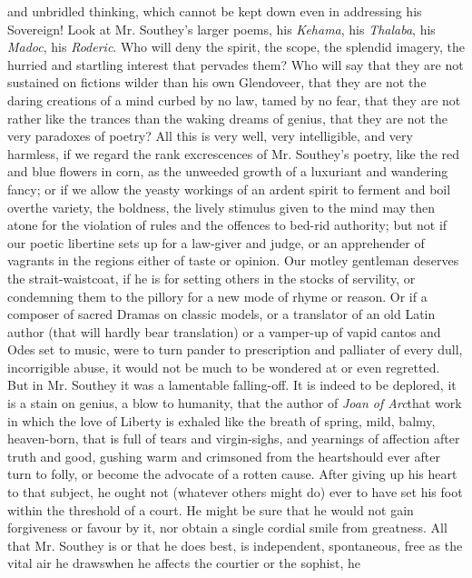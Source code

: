 and unbridled thinking, which cannot be kept down even in
addressing his Sovereign! Look at Mr. Southey's larger poems, his
\emph{Kehama}, his \emph{Thalaba}, his \emph{Madoc}, his
\emph{Roderic}. Who will deny the spirit, the scope, the splendid
imagery, the hurried and startling interest that pervades them?
Who will say that they are not sustained on fictions wilder than
his own Glendoveer, that they are not the daring creations of a
mind curbed by no law, tamed by no fear, that they are not rather
like the trances than the waking dreams of genius, that they are
not the very paradoxes of poetry? All this is very well, very
intelligible, and very harmless, if we regard the rank
excrescences of Mr. Southey's poetry, like the red and blue
flowers in corn, as the unweeded growth of a luxuriant and
wandering fancy; or if we allow the yeasty workings of an ardent
spirit to ferment and boil over\textemdash the variety, the
boldness, the lively stimulus given to the mind may then atone for
the violation of rules and the offences to bed-rid authority; but
not if our poetic libertine sets up for a law-giver and judge, or
an apprehender of vagrants in the regions either of taste or
opinion. Our motley gentleman deserves the strait-waistcoat, if he
is for setting others in the stocks of servility, or condemning
them to the pillory for a new mode of rhyme or reason. Or if a
composer of sacred Dramas on classic models, or a translator of an
old Latin author (that will hardly bear translation) or a
vamper-up of vapid cantos and Odes set to music, were to turn
pander to prescription and palliater of every dull, incorrigible
abuse, it would not be much to be wondered at or even
regretted. But in Mr. Southey it was a lamentable falling-off. It
is indeed to be deplored, it is a stain on genius, a blow to
humanity, that the author of \emph{Joan of Arc}\textemdash that
work in which the love of Liberty is exhaled like the breath of
spring, mild, balmy, heaven-born, that is full of tears and
virgin-sighs, and yearnings of affection after truth and good,
gushing warm and crimsoned from the heart\textemdash should ever
after turn to folly, or become the advocate of a rotten
cause. After giving up his heart to that subject, he ought not
(whatever others might do) ever to have set his foot within the
threshold of a court. He might be sure that he would not gain
forgiveness or favour by it, nor obtain a single cordial smile
from greatness. All that Mr. Southey is or that he does best, is
independent, spontaneous, free as the vital air he
draws\textemdash when he affects the courtier or the sophist, he
